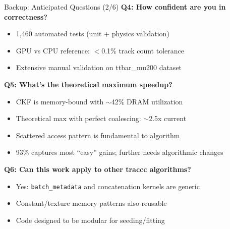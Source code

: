 \documentclass[aspectratio=169, table]{beamer}
\begin{document}
\begin{frame}{Backup: Anticipated Questions (2/6)}
\textbf{Q4: How confident are you in correctness?}
\begin{itemize}
    \item 1,460 automated tests (unit + physics validation)
    \item GPU vs CPU reference: $<$0.1\% track count tolerance
    \item Extensive manual validation on ttbar\_mu200 dataset
\end{itemize}

\vspace{0.5em}
\textbf{Q5: What's the theoretical maximum speedup?}
\begin{itemize}
    \item CKF is memory-bound with $\sim$42\% DRAM utilization
    \item Theoretical max with perfect coalescing: $\sim$2.5x current
    \item Scattered access pattern is fundamental to algorithm
    \item 93\% captures most ``easy'' gains; further needs algorithmic changes
\end{itemize}

\vspace{0.5em}
\textbf{Q6: Can this work apply to other traccc algorithms?}
\begin{itemize}
    \item Yes: \texttt{batch\_metadata} and concatenation kernels are generic
    \item Constant/texture memory patterns also reusable
    \item Code designed to be modular for seeding/fitting
\end{itemize}
\end{frame}
\end{document}
